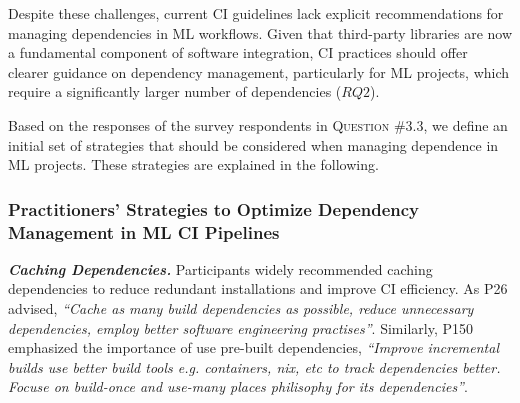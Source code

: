 
Despite these challenges, current CI guidelines lack explicit recommendations for managing dependencies in ML workflows. 
Given that third-party libraries are now a fundamental component of software integration, CI practices should offer clearer guidance on dependency management, particularly for ML projects, which require a significantly larger number of dependencies ($RQ2$).

Based on the responses of the survey respondents in \textsc{Question \#3.3}, we define an initial set of strategies that should be considered when managing dependence in ML projects. These strategies are explained in the following.

\subsubsection*{Practitioners' Strategies to Optimize Dependency Management in ML CI Pipelines}

\textit{\textbf{Caching Dependencies.}}
Participants widely recommended caching dependencies to reduce redundant installations and improve CI efficiency. As P26 advised,  \textit{``Cache as many build dependencies as possible, reduce unnecessary dependencies, employ better software engineering practises''}. 
Similarly, P150 emphasized the importance of use pre-built dependencies, \textit{``Improve incremental builds use better build tools e.g. containers, nix, etc to track dependencies better. Focuse on build-once and use-many places philisophy for its dependencies''}. 


